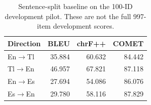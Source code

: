 \begin{table}[t]\centering\small
\caption{Sentence-split baseline on the 100-ID development pilot. These are not the full 997-item development scores.}\label{tab:pilotbase}
\begin{tabular}{lrrr}\toprule Direction & BLEU & chrF++ & COMET \\\midrule
En$\to$Tl & 35.884 & 60.632 & 84.442 \\
Tl$\to$En & 46.957 & 67.821 & 87.118 \\
En$\to$Es & 27.694 & 54.086 & 86.076 \\
Es$\to$En & 29.780 & 58.116 & 87.829 \\
\bottomrule\end{tabular}\end{table}
